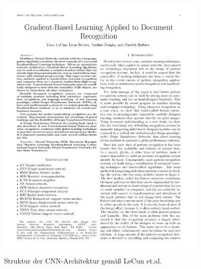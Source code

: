 {\begin{figure}
  \includegraphics[page=7,width=0.9\textwidth,viewport=20 600 560 740,clip]{../../MLbib/CNN/Lecun98.pdf}

  \caption{Struktur der CNN-Architektur gemäß LeCun et.al. \cite{LeCun:1998}}\label{Concept:LeNet}
\end{figure}

}

